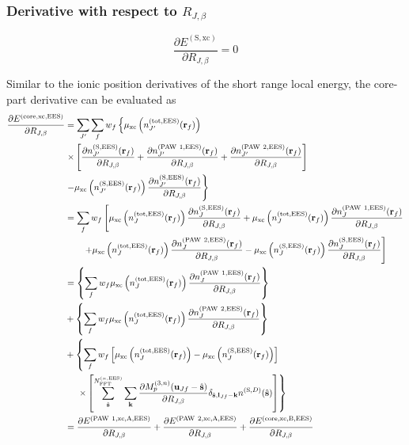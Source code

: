 \documentclass[paper=a4, fontsize=11pt]{article} %
\numberwithin{equation}{section} %
\numberwithin{figure}{section} %
\numberwithin{table}{section} %
\newcommand{\p}{\partial}
\newcommand{\bu}{{\bf{u}}}
\newcommand{\bl}{{\bf{l}}}
\newcommand{\bk}{{\bf{k}}}
\newcommand{\bs}{{\bf{s}}}
\newcommand{\br}{{\bf{r}}}
\newcommand{\rS}{{\mathrm{S}}}
\newcommand{\rEES}{{\mathrm{EES}}}
\newcommand{\rxc}{{\mathrm{xc}}}
\newcommand{\rcore}{{\mathrm{core}}}
\newcommand{\rP}{{\mathrm{PAW}}}
\newcommand{\rA}{{\mathrm{A}}}
\newcommand{\rB}{{\mathrm{B}}}
\newcommand{\rtot}{{\mathrm{tot}}}
\newcommand{\RJb}{{R_{J,\beta}}}
\newcommand{\NFFTnEES}{{N^{(n,\rEES)}_{\mathrm{FFT}}}}
\newcommand{\Mn}{{M_p^{(3,n)}}}
\begin{document}
\subsubsection{Derivative with respect to $\RJb$}

\begin{equation}
\frac{\p E^{(\rS,\rxc)}}{\p \RJb}=0
\end{equation}

Similar to the ionic position derivatives of the short range local energy, the core-part derivative can be evaluated as
\begin{equation}\label{eq:dExccoredR}
\begin{split}
\frac{\p E^{(\rcore,\rxc,\rEES)}}{\p \RJb}
&= \sum_{J'}\sum_f w_f \left\{\mu_{\rxc}
\left(  n^{(\rtot,\rEES)}_{J'}(\br_f)  \right) \right. \\
&\left.\times \left[\frac{\p n^{(\rS,\rEES)}_{J'}(\br_f)}{\p \RJb} +\frac{\p n^{(\rP\ 1,\rEES)}_{J'}(\br_f)}{\p \RJb}+\frac{\p n^{(\rP\ 2,\rEES)}_{J'}(\br_f)}{\p \RJb}\right] \right.\\
&\left. -\mu_{\rxc}\left(n_{J'}^{(\rS,\rEES)}(\br_f)\right) \frac{\p n_{J'}^{(\rS,\rEES)}(\br_f)}{\p \RJb}  \right\} \\
&= \sum_f w_f \left[\mu_{\rxc} \left(  n^{(\rtot,\rEES)}_J(\br_f)  \right) \frac{\p n^{(\rS,\rEES)}_J(\br_f)}{\p \RJb} + \mu_{\rxc} \left( n^{(\rtot,\rEES)}_J(\br_f)  \right) \frac{\p n^{(\rP\ 1,\rEES)}_J(\br_f) }{\p \RJb} \right. \\
&\left.\ \ \ \ \ \  + \mu_{\rxc} \left(  n^{(\rtot,\rEES)}_J(\br_f) \right) \frac{\p n^{(\rP\ 2,\rEES)}_J(\br_f) }{\p \RJb} -\mu_{\rxc}\left(n_J^{(\rS,\rEES)}(\br_f)\right) \frac{\p n_J^{(\rS,\rEES)}(\br_f)}{\p \RJb}  \right] \\
&= \left\{\sum_f w_f \mu_{\rxc} \left( n^{(\rtot,\rEES)}_J(\br_f)  \right) \frac{\p n^{(\rP\ 1,\rEES)}_J(\br_f) }{\p \RJb} \right\} \\
&+ \left\{ \sum_f w_f \mu_{\rxc} \left( n^{(\rtot,\rEES)}_J(\br_f)  \right) \frac{\p n^{(\rP\ 2,\rEES)}_J(\br_f) }{\p \RJb} \right\} \\
&+ \left\{\sum_f w_f \left[\mu_{\rxc} \left(  n^{(\rtot,\rEES)}_J(\br_f)  \right) - \mu_{\rxc} \left(  n^{(\rS,\rEES)}_J(\br_f)  \right) \right] \right. \\
&\left. \ \ \ \ \times \left[\sum_{\hat \bs}^{\NFFTnEES} \sum_{\bk} \frac{\p \Mn(\bu_{Jf}-\hat \bs)}{\p \RJb}\delta_{\hat \bs,\bl_{Jf}-\bk} n^{(\rS,D)}(\hat \bs) \right]\right\}\\
&= \frac{\p E^{(\rP\ 1,\rxc,\rA,\rEES)}}{\p \RJb} + \frac{\p E^{(\rP\ 2,\rxc,\rA,\rEES)}}{\p \RJb}+ \frac{\p E^{(\rcore,\rxc,\rB,\rEES)}}{\p \RJb}
\end{split}
\end{equation}
\end{document}
